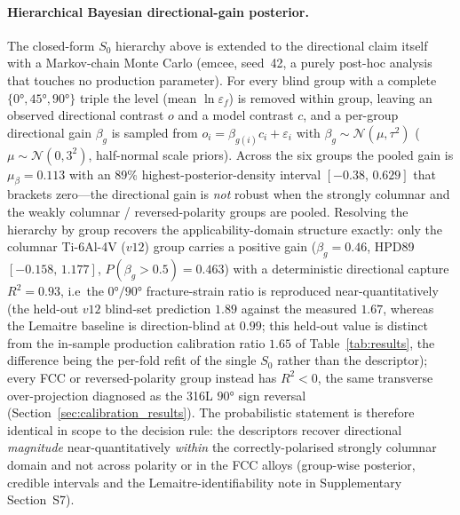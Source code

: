 \documentclass[12pt,a4paper,twocolumn]{article}
\begin{document}
\paragraph{Hierarchical Bayesian directional-gain posterior.} The closed-form $S_0$ hierarchy above is extended to the directional claim itself with a Markov-chain Monte Carlo (emcee, seed~42, a purely post-hoc analysis that touches no production parameter). For every blind group with a complete $\{\ang{0},\ang{45},\ang{90}\}$ triple the level (mean $\ln\varepsilon_f$) is removed within group, leaving an observed directional contrast $o$ and a model contrast $c$, and a per-group directional gain $\beta_g$ is sampled from $o_i = \beta_{g(i)} c_i + \varepsilon_i$ with $\beta_g \sim \mathcal{N}(\mu,\tau^2)$ ($\mu\sim\mathcal{N}(0,3^2)$, half-normal scale priors). Across the six groups the pooled gain is $\mu_\beta = 0.113$ with an 89\% highest-posterior-density interval $[-0.38,\,0.629]$ that brackets zero---the directional gain is \emph{not} robust when the strongly columnar and the weakly columnar / reversed-polarity groups are pooled. Resolving the hierarchy by group recovers the applicability-domain structure exactly: only the columnar Ti-6Al-4V ($v12$) group carries a positive gain ($\beta_g = 0.46$, HPD89 $[-0.158,\,1.177]$, $P(\beta_g > 0.5) = 0.463$) with a deterministic directional capture $R^2 = 0.93$, i.e\ the $\ang{0}/\ang{90}$ fracture-strain ratio is reproduced near-quantitatively (the held-out $v12$ blind-set prediction $1.89$ against the measured $1.67$, whereas the Lemaitre baseline is direction-blind at $0.99$; this held-out value is distinct from the in-sample production calibration ratio $1.65$ of Table~\ref{tab:results}, the difference being the per-fold refit of the single $S_0$ rather than the descriptor); every FCC or reversed-polarity group instead has $R^2 < 0$, the same transverse over-projection diagnosed as the 316L $\ang{90}$ sign reversal (Section~\ref{sec:calibration_results}). The probabilistic statement is therefore identical in scope to the decision rule: the descriptors recover directional \emph{magnitude} near-quantitatively \emph{within} the correctly-polarised strongly columnar domain and not across polarity or in the FCC alloys (group-wise posterior, credible intervals and the Lemaitre-identifiability note in Supplementary Section~S7).
\end{document}
